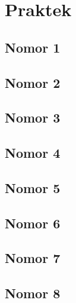 \chapter{Praktek}

\section{Nomor 1}


\section{Nomor 2}


\section{Nomor 3}


\section{Nomor 4}


\section{Nomor 5}


\section{Nomor 6}


\section{Nomor 7}


\section{Nomor 8}



